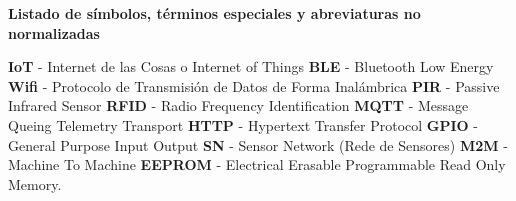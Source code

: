 \renewcommand{\thepage}{\Roman{page}}
    \textbf{\Large Listado de símbolos, términos especiales y abreviaturas no normalizadas}\newline

    \textbf{IoT} - Internet de las Cosas o Internet of Things
    \newline
    \textbf{BLE} - Bluetooth Low Energy
    \newline
    \textbf{Wifi} - Protocolo de Transmisión de Datos de Forma Inalámbrica
    \newline
    \textbf{PIR} - Passive Infrared Sensor
    \newline
    \textbf{RFID} - Radio Frequency Identification
    \newline
    \textbf{MQTT} - Message Queing Telemetry Transport
    \newline
    \textbf{HTTP} - Hypertext Transfer Protocol
    \newline
    \textbf{GPIO} - General Purpose Input Output
    \newline
    \textbf{SN} - Sensor Network (Rede de Sensores)
    \newline
    \textbf{M2M} - Machine To Machine
    \newline
    \textbf{EEPROM} - Electrical Erasable Programmable Read Only Memory. 
    
    \setcounter{page}{1}
    \thispagestyle{plain}